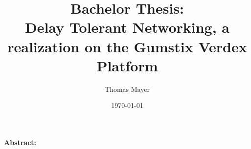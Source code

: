 \documentclass[a4paper, twoside, 11pt]{book}
\author{Thomas Mayer}
\title{Bachelor Thesis:\\ Delay Tolerant Networking, a realization on the Gumstix Verdex Platform}
\date{\today}
\begin{document}

\pagestyle{empty}



\begin{center}
 \textbf{Abstract:}
\end{center}





\clearpage{\pagestyle{empty}\cleardoublepage}
\pagestyle{headings}
\listoffigures
\listoftables
\tableofcontents
\clearpage{\pagestyle{empty}\cleardoublepage}










\clearpage{\pagestyle{empty}\cleardoublepage} 
\def\glossaryname{Glossary}
\printglossary

\def\acronymname{List of Acronyms}
\printacronym


\printindex


\end{document}
